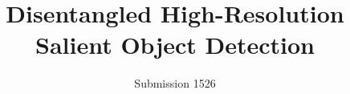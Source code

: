 \documentclass[sigconf]{acmart}
\begin{document}
%
\title{Disentangled High-Resolution Salient Object Detection}
\subtitle{Submission 1526}
%



 




%
\renewcommand{\shortauthors}{Trovato and Tobin, et al.}
\end{document}
